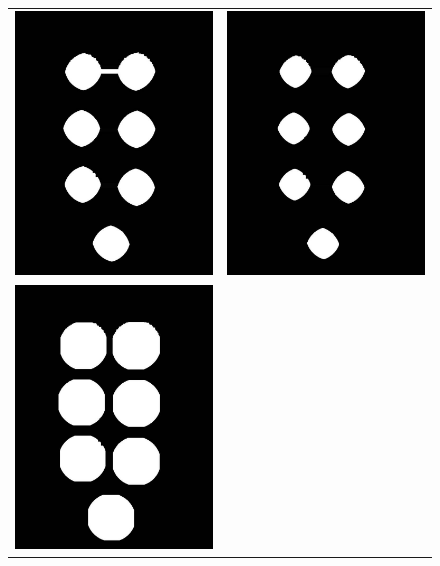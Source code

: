 	\newpage

	\begin{figure}[!h]
		\centering
		\begin{tabular}{cc}
			\includegraphics[width=7.5cm]{Imagenes/op_morf_monedas_5.jpeg} & \includegraphics[width=7.5cm]{Imagenes/op_morf_monedas_6.jpeg} \\
			\includegraphics[width=7.5cm]{Imagenes/op_morf_monedas_final.jpeg} &

\end{tabular}
\end{figure}
